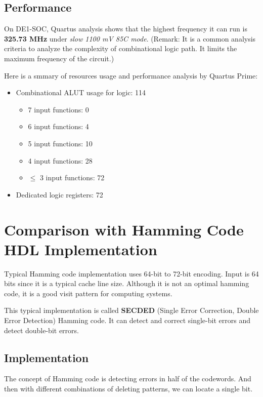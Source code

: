 \documentclass[conference]{IEEEtran}
\begin{document}
\subsection{Performance}
On DE1-SOC, Quartus analysis shows that the highest frequency it can run is \textbf{325.73 MHz} under \textit{slow 1100 mV 85C mode}. (Remark: It is a common analysis criteria to analyze the complexity of combinational logic path. It limits the maximum frequency of the circuit.)

Here is a smmary of resources usage and performance analysis by Quartus Prime:
\begin{itemize}
  \item Combinational ALUT usage for logic: 114 \begin{itemize}
    \item 7 input functions: 0
    \item 6 input functions: 4
    \item 5 input functions: 10
    \item 4 input functions: 28
    \item $\leq$ 3 input functions: 72
  \end{itemize}
  \item Dedicated logic registers: 72
\end{itemize}

\section{Comparison with Hamming Code HDL Implementation}
Typical Hamming code implementation uses 64-bit to 72-bit encoding. Input is 64
bits since it is a typical cache line size. Although it is not an optimal
hamming code, it is a good visit pattern for computing systems.

This typical implementation is called \textbf{SECDED} (Single Error Correction,
Double Error Detection) Hamming code. It can detect and correct single-bit
errors and detect double-bit errors.
\subsection{Implementation}
The concept of Hamming code is detecting errors in half of the codewords. And
then with different combinations of deleting patterns, we can locate a single
bit.
\end{document}
